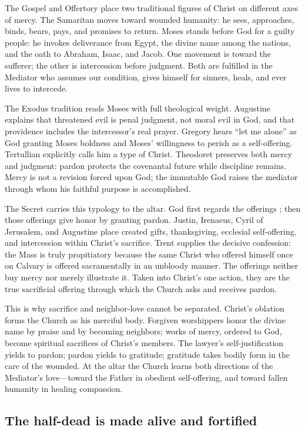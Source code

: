 The Gospel and Offertory place two traditional figures of Christ on different
axes of mercy. The Samaritan moves toward wounded humanity: he sees, approaches,
binds, bears, pays, and promises to return. Moses stands before God for a
guilty people: he invokes deliverance from Egypt, the divine name among the
nations, and the oath to Abraham, Isaac, and Jacob. One movement is toward the
sufferer; the other is intercession before judgment. Both are fulfilled in the
Mediator who assumes our condition, gives himself for sinners, heals, and ever
lives to intercede.

The Exodus tradition reads Moses with full theological weight. Augustine
explains that threatened evil is penal judgment, not moral evil in God, and
that providence includes the intercessor's real prayer. Gregory hears ``let me
alone'' as God granting Moses boldness and Moses' willingness to perish as a
self-offering. Tertullian explicitly calls him a type of Christ. Theodoret
preserves both mercy and judgment: pardon protects the covenantal future while
discipline remains. Mercy is not a revision forced upon God; the immutable God
raises the mediator through whom his faithful purpose is accomplished.

The Secret carries this typology to the altar. God first regards the offerings
; then those offerings give honor by granting pardon.
Justin, Irenaeus, Cyril of Jerusalem, and Augustine place created gifts,
thanksgiving, ecclesial self-offering, and intercession within Christ's
sacrifice. Trent supplies the decisive confession: the Mass is truly
propitiatory because the same Christ who offered himself once on Calvary is
offered sacramentally in an unbloody manner. The offerings neither buy mercy
nor merely illustrate it. Taken into Christ's one action, they are the true
sacrificial offering through which the Church asks and receives pardon.

This is why sacrifice and neighbor-love cannot be separated. Christ's
oblation forms the Church as his merciful body. Forgiven worshippers honor the
divine name by praise and by becoming neighbors; works of mercy, ordered to
God, become spiritual sacrifices of Christ's members. The lawyer's
self-justification yields to pardon; pardon yields to gratitude; gratitude
takes bodily form in the care of the wounded. At the altar the Church learns
both directions of the Mediator's love---toward the Father in obedient
self-offering, and toward fallen humanity in healing compassion.

\subsection*{The half-dead is made alive and fortified \enspace{}}

